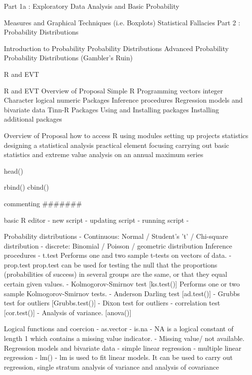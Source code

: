 \documentclass[a4paper,12pt]{article}
\begin{document}
\tableofcontents

Part 1a : Exploratory Data Analysis and Basic Probability

Measures and Graphical Techniques (i.e. Boxplots)
Statistical Fallacies
Part 2 : Probability Distributions

Introduction to Probability
Probability Distributions
Advanced Probability
Probability Distributions (Gambler's Ruin)






R and EVT

R and EVT
Overview of Proposal
Simple R Programming
vectors
integer
Character
logical
numeric
Packages
Inference procedures
Regression models and bivariate data
Tinn-R
Packages
Using and Installing packages
Installing additional packages

Overview of Proposal
how to access R
using modules
setting up projects
statistics
designing a statistical analysis
practical element focusing carrying out basic statistics and extreme value analysis on an annual maximum series
 
 
head()

rbind()
cbind()




commenting #######


basic R editor
 - new script
 - updating script
 - running script
 -
 
Probability distributions
 - Continuous: Normal / Student's 't' / Chi-square distribution
 - discrete: Binomial / Poisson / geometric distribution
Inference procedures
 - t.test
Performs one and two sample t-tests on vectors of data. 
 - prop.test
	    prop.test can be used for testing the null that the proportions (probabilities of success) in several groups are the same, or that they equal certain given values.
 - Kolmogorov-Smirnov test      [ks.test()]
Performs one or two sample Kolmogorov-Smirnov tests. 
 - Anderson Darling test        [ad.test()]
 - Grubbs test for outliers     [Grubbs.test()]
 - Dixon test for outliers
 - correlation test [cor.test()]
 - Analysis of variance. [anova()]
 

Logical functions and coercion
 - as.vector
 - is.na
 - NA is a logical constant of length 1 which contains a missing value indicator.
 - Missing value/ not available. 
Regression models and bivariate data
 - simple linear regression 
 - multiple linear regression 
 - lm()
 - lm is used to fit linear models. It can be used to carry out regression, single stratum analysis of variance and analysis of covariance 
\end{document}
